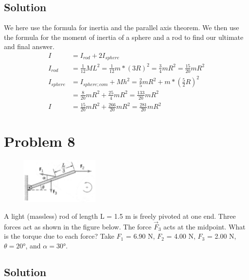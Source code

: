 \documentclass[12pt]{article}
\begin{document}
\subsection*{Solution}
We here use the formula for inertia and the parallel axis theorem. We then use the formula for the moment of inertia of a sphere and a rod to find our ultimate and final answer.
\begin{align*}
    I   &=  I_{rod} + 2I_{sphere}\\
    I_{rod} &=  \frac{1}{12}ML^2
        =   \frac{1}{12}m*(3R)^2
        =   \frac{3}{4}mR^2
        =   \frac{15}{20}mR^2\\
    I_{sphere}  &=  I_{sphere;com} + Mh^2
        =   \frac{2}{5}mR^2 + m*\left(\frac{5}{2}R\right)^2\\
        &=  \frac{8}{20}mR^2 + \frac{25}{4}mR^2
        =   \frac{133}{20}mR^2\\
    I   &=  \frac{15}{20}mR^2 + \frac{266}{20}mR^2
        =   \boxed{\frac{281}{20}mR^2}
\end{align*}


\pagebreak
\section*{Problem 8}
\begin{figure}
    \vspace{-30pt}
    \includegraphics[width=0.35\textwidth]{graph_8.png} 
\end{figure}
A light (massless) rod of length L = 1.5 m is freely pivoted at one end. Three forces act as
shown in the figure below. The force $\vec{F}_3$ acts at the midpoint. What is the torque due to each force?
Take $F_1$ = 6.90 N, $F_2$ = 4.00 N, $F_3$ = 2.00 N, $\theta = 20\unit{\degree}$, and $\alpha = 30\unit{\degree}$.

\subsection*{Solution}
 
\end{document}
